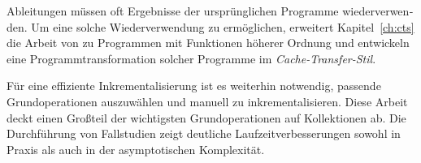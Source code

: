 \begin{otherlanguage}{ngerman}
Ableitungen müssen oft Ergebnisse der ursprünglichen Programme wiederverwenden. Um
eine solche Wiederverwendung zu ermöglichen, erweitert Kapitel~\ref{ch:cts} die
Arbeit von \citet{Liu95} zu Programmen mit Funktionen höherer Ordnung und
entwickeln eine Programmtransformation solcher Programme im \emph{Cache-Transfer-Stil}.

Für eine effiziente Inkrementalisierung ist es weiterhin notwendig, passende
Grundoperationen auszuwählen und manuell zu inkrementalisieren. Diese
Arbeit deckt einen Großteil der wichtigsten Grundoperationen auf
Kollektionen ab. Die Durchführung von Fallstudien zeigt deutliche
Laufzeitverbesserungen sowohl in Praxis als auch in der asymptotischen
Komplexität.

\end{otherlanguage}

